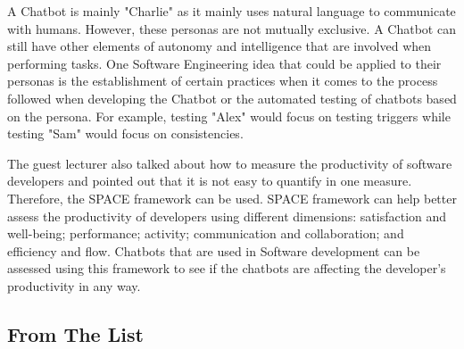 \documentclass[10pt, a4paper]{article}
\begin{document}
A Chatbot is mainly "Charlie" as it mainly uses natural language to communicate with humans. However, these personas are not mutually exclusive. A Chatbot can still have other elements of autonomy and intelligence that are involved when performing tasks. One Software Engineering idea that could be applied to their personas is the establishment of certain practices when it comes to the process followed when developing the Chatbot or the automated testing of chatbots based on the persona. For example, testing "Alex" would focus on testing triggers while testing "Sam" would focus on consistencies.

 The guest lecturer also talked about how to measure the productivity of software developers and pointed out that it is not easy to quantify in one measure. Therefore, the SPACE framework can be used. SPACE framework can help better assess the productivity of developers using different dimensions: satisfaction and well-being; performance; activity; communication and collaboration; and efficiency and flow. Chatbots that are used in Software development can be assessed using this framework to see if the chatbots are affecting the developer's productivity in any way.


\subsection{From The List} 

\end{document}
